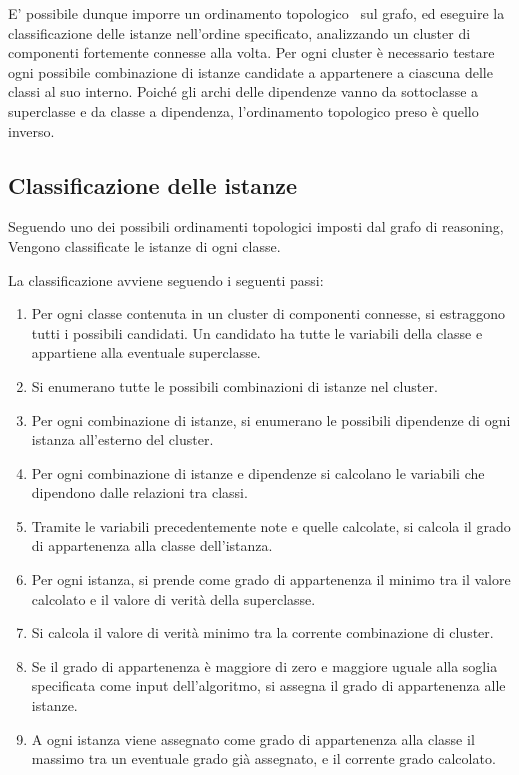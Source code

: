 E' possibile dunque imporre un ordinamento topologico~\cite{Kahn:1962:TSL:368996.369025} sul grafo, ed eseguire la classificazione delle istanze nell'ordine specificato, analizzando un cluster di componenti fortemente connesse alla volta. Per ogni cluster è necessario testare ogni possibile combinazione di istanze candidate a appartenere a ciascuna delle classi al suo interno. Poiché gli archi delle dipendenze vanno da sottoclasse a superclasse e da classe a dipendenza, l'ordinamento topologico preso è quello inverso.

\subsection{Classificazione delle istanze}

Seguendo uno dei possibili ordinamenti topologici imposti dal grafo di reasoning, Vengono classificate le istanze di ogni classe.

La classificazione avviene seguendo i seguenti passi:

\begin{enumerate}
 \item Per ogni classe contenuta in un cluster di componenti connesse, si estraggono tutti i possibili candidati. Un candidato ha tutte le variabili della classe e appartiene alla eventuale superclasse.
 \item Si enumerano tutte le possibili combinazioni di istanze nel cluster.
 \item Per ogni combinazione di istanze, si enumerano le possibili dipendenze di ogni istanza all'esterno del cluster.
 \item Per ogni combinazione di istanze e dipendenze si calcolano le variabili che dipendono dalle relazioni tra classi.
 \item Tramite le variabili precedentemente note e quelle calcolate, si calcola il grado di appartenenza alla classe dell'istanza.
 \item Per ogni istanza, si prende come grado di appartenenza il minimo tra il valore calcolato e il valore di verità della superclasse.
 \item Si calcola il valore di verità minimo tra la corrente combinazione di cluster.
 \item Se il grado di appartenenza è maggiore di zero e maggiore uguale alla soglia specificata come input dell'algoritmo, si assegna il grado di appartenenza alle istanze.
 \item A ogni istanza viene assegnato come grado di appartenenza alla classe il massimo tra un eventuale grado già assegnato, e il corrente grado calcolato. 
\end{enumerate}

